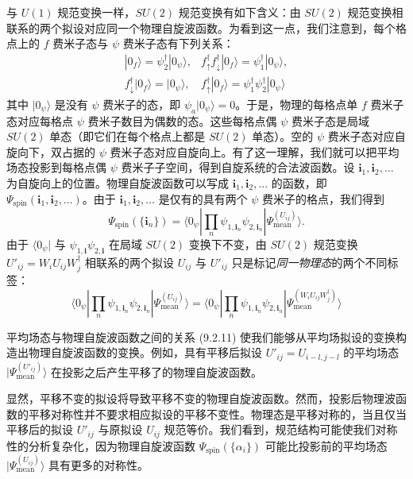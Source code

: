 与 $U(1)$ 规范变换一样，$SU(2)$ 规范变换有如下含义：由 $SU(2)$ 规范变换相联系的两个拟设对应同一个物理自旋波函数。为看到这一点，我们注意到，每个格点上的 $f$ 费米子态与 $\psi$ 费米子态有下列关系：
\begin{equation*}
\begin{array}{ll}
|0_f\rangle=\psi^{\dagger}_2|0_{\psi}\rangle, & f^{\dagger}_{\uparrow}f^{\dagger}_{\downarrow}|0_f\rangle=\psi^{\dagger}_1|0_{\psi}\rangle,\\
f^{\dagger}_{\downarrow}|0_f\rangle=|0_{\psi}\rangle, & f^{\dagger}_{\uparrow}|0_f\rangle=\psi^{\dagger}_1\psi^{\dagger}_2|0_{\psi}\rangle
\end{array}
\end{equation*}
其中 $|0_{\psi}\rangle$ 是没有 $\psi$ 费米子的态，即 $\psi_a|0_{\psi}\rangle=0$。于是，物理的每格点单 $f$ 费米子态对应每格点 $\psi$ 费米子数目为偶数的态。这些每格点偶 $\psi$ 费米子态是局域 $SU(2)$ 单态（即它们在每个格点上都是 $SU(2)$ 单态）。空的 $\psi$ 费米子态对应自旋向下，双占据的 $\psi$ 费米子态对应自旋向上。有了这一理解，我们就可以把平均场态投影到每格点偶 $\psi$ 费米子子空间，得到自旋系统的合法波函数。设 $\pmb{i}_1,\pmb{i}_2,\dots$ 为自旋向上的位置。物理自旋波函数可以写成 $\pmb{i}_1,\pmb{i}_2,\dots$ 的函数，即 $\Psi_{\text{spin}}(\pmb{i}_1,\pmb{i}_2,\dots)$。由于 $\pmb{i}_1,\pmb{i}_2,\dots$ 是仅有的具有两个 $\psi$ 费米子的格点，我们得到
\begin{equation*}
\Psi_{\text{spin}}(\{\pmb{i}_n\})=\langle 0_{\psi}|\prod_n\psi_{1,\pmb{i}_n}\psi_{2,\pmb{i}_n}|\Psi^{(U_{ij})}_{\text{mean}}\rangle.
\tag{9.2.11}
\end{equation*}
由于 $\langle 0_{\psi}|$ 与 $\psi_{1,\pmb{i}}\psi_{2,\pmb{i}}$ 在局域 $SU(2)$ 变换下不变，由 $SU(2)$ 规范变换 $U'_{ij}=W_iU_{ij}W^{\dagger}_j$ 相联系的两个拟设 $U_{ij}$ 与 $U'_{ij}$ 只是标记\emph{同一物理态}的两个不同标签：
\begin{equation*}
\langle 0_{\psi}|\prod_n\psi_{1,\pmb{i}_n}\psi_{2,\pmb{i}_n}|\Psi^{(U_{ij})}_{\text{mean}}\rangle=\langle 0_{\psi}|\prod_n\psi_{1,\pmb{i}_n}\psi_{2,\pmb{i}_n}|\Psi^{(W_iU_{ij}W^{\dagger}_j)}_{\text{mean}}\rangle
\tag{9.2.12}
\end{equation*}

平均场态与物理自旋波函数之间的关系 (9.2.11) 使我们能够从平均场拟设的变换构造出物理自旋波函数的变换。例如，具有平移后拟设 $U'_{ij}=U_{i-l,j-l}$ 的平均场态 $|\Psi^{(U'_{ij})}_{\text{mean}}\rangle$ 在投影之后产生平移了的物理自旋波函数。

显然，平移不变的拟设将导致平移不变的物理自旋波函数。然而，投影后物理波函数的平移对称性并不要求相应拟设的平移不变性。物理态是平移对称的，当且仅当平移后的拟设 $U'_{ij}$ 与原拟设 $U_{ij}$ 规范等价。我们看到，规范结构可能使我们对称性的分析复杂化，因为物理自旋波函数 $\Psi_{\text{spin}}(\{\alpha_i\})$ 可能比投影前的平均场态 $|\Psi^{(U_{ij})}_{\text{mean}}\rangle$ 具有更多的对称性。


